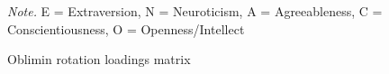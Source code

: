 \documentclass[
  english,
  man]{apa6}
\begin{document}
\begin{table}[tbp]
\begin{center}
\begin{threeparttable}
{}

\begin{tablenotes}[para]
\normalsize{\textit{Note.} E = Extraversion, N = Neuroticism, A = Agreeableness, C = Conscientiousness, O = Openness/Intellect}
\end{tablenotes}

\end{threeparttable}
\end{center}

\end{table}

\begin{table}[tbp]

\begin{center}
\begin{threeparttable}

\caption{\label{tab:obliminTable}Oblimin rotation loadings matrix}

\tiny{

}
\end{threeparttable}
\end{center}
\end{table}
\end{document}
